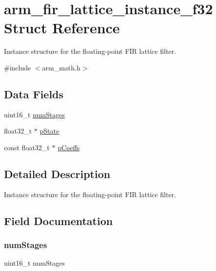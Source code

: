 \hypertarget{structarm__fir__lattice__instance__f32}{}\section{arm\+\_\+fir\+\_\+lattice\+\_\+instance\+\_\+f32 Struct Reference}
\label{structarm__fir__lattice__instance__f32}


Instance structure for the floating-\/point F\+IR lattice filter.  




{\ttfamily \#include $<$arm\+\_\+math.\+h$>$}

\subsection*{Data Fields}
\begin{DoxyCompactItemize}
\item 
uint16\+\_\+t \mbox{\hyperlink{structarm__fir__lattice__instance__f32_a4cceb90547b3e585d4c7aabaa8057212}{num\+Stages}}
\item 
float32\+\_\+t $\ast$ \mbox{\hyperlink{structarm__fir__lattice__instance__f32_a335c87e6fdc4b96601d95a5de8b9c463}{p\+State}}
\item 
const float32\+\_\+t $\ast$ \mbox{\hyperlink{structarm__fir__lattice__instance__f32_a39230f04a29d8321948e339633780442}{p\+Coeffs}}
\end{DoxyCompactItemize}


\subsection{Detailed Description}
Instance structure for the floating-\/point F\+IR lattice filter. 

\subsection{Field Documentation}
\mbox{\label{structarm__fir__lattice__instance__f32_a4cceb90547b3e585d4c7aabaa8057212}} 
\subsubsection{\texorpdfstring{numStages}{numStages}}
{\footnotesize\ttfamily uint16\+\_\+t num\+Stages}

